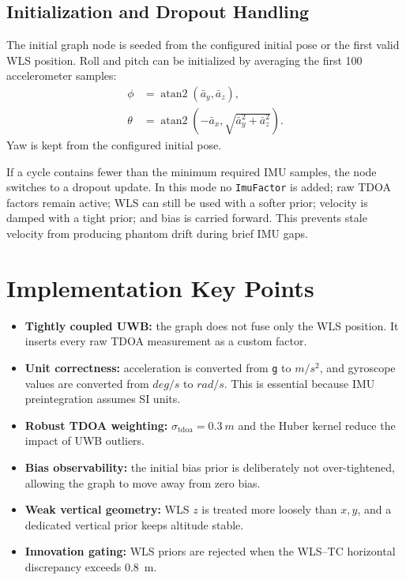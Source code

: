 \documentclass[11pt,a4paper]{article}
\begin{document}
\subsection{Initialization and Dropout Handling}

The initial graph node is seeded from the configured initial pose or the first valid WLS position. Roll and pitch can be initialized by averaging the first 100 accelerometer samples:
\begin{align}
  \phi &= \operatorname{atan2}(\bar{a}_y,\bar{a}_z),\\
  \theta &= \operatorname{atan2}(-\bar{a}_x,\sqrt{\bar{a}_y^2+\bar{a}_z^2}).
\end{align}
Yaw is kept from the configured initial pose.

If a cycle contains fewer than the minimum required IMU samples, the node switches to a dropout update. In this mode no \texttt{ImuFactor} is added; raw TDOA factors remain active; WLS can still be used with a softer prior; velocity is damped with a tight prior; and bias is carried forward. This prevents stale velocity from producing phantom drift during brief IMU gaps.

\section{Implementation Key Points}

\begin{itemize}[leftmargin=*]
  \item \textbf{Tightly coupled UWB:} the graph does not fuse only the WLS position. It inserts every raw TDOA measurement as a custom factor.
  \item \textbf{Unit correctness:} acceleration is converted from \texttt{g} to \(\si{m/s^2}\), and gyroscope values are converted from \(\si{deg/s}\) to \(\si{rad/s}\). This is essential because IMU preintegration assumes SI units.
  \item \textbf{Robust TDOA weighting:} \(\sigma_{\mathrm{tdoa}}=\SI{0.3}{m}\) and the Huber kernel reduce the impact of UWB outliers.
  \item \textbf{Bias observability:} the initial bias prior is deliberately not over-tightened, allowing the graph to move away from zero bias.
  \item \textbf{Weak vertical geometry:} WLS \(z\) is treated more loosely than \(x,y\), and a dedicated vertical prior keeps altitude stable.
  \item \textbf{Innovation gating:} WLS priors are rejected when the WLS--TC horizontal discrepancy exceeds \SI{0.8}{m}.
\end{itemize}
\end{document}
